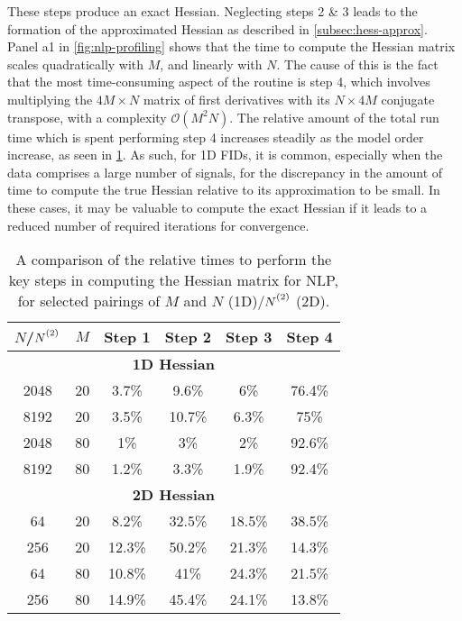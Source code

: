 These steps produce an exact Hessian. Neglecting steps 2 \& 3 leads to the
formation of the approximated Hessian as described in
\cref{subsec:hess-approx}. Panel a1 in \cref{fig:nlp-profiling} shows that the
time to compute the Hessian matrix scales quadratically with $M$, and
linearly with $N$. The cause of this is the fact that the most time-consuming
aspect of the routine is step 4, which involves multiplying the $4M \times N$
matrix of first derivatives with its  $N \times 4M$ conjugate transpose, with a
complexity $\mathcal{O}(M^2N)$. The relative amount of the total run time which
is spent performing step 4 increases steadily as the model order increase, as
seen in \cref{tab:hess-steps}.
As such, for \ac{1D} \acp{FID}, it is
common, especially when the data comprises a large number of
signals, for the discrepancy in the amount of time to compute the true
Hessian relative to its approximation to be small. In these cases, it may be
valuable to compute the exact Hessian if it leads to a reduced number of
required iterations for convergence.
\begin{table}
    \begin{center}
        \begin{tabular}{ c c c c c c }
            \toprule
            $N$/$\Ntwo$ &
            $M$ &
            Step 1 &
            Step 2 &
            Step 3 &
            Step 4 \\
            \midrule
            \multicolumn{6}{c}{\textbf{1D Hessian}}\\
            \midrule
            2048 & 20 & 3.7\% & 9.6\% & 6\% & 76.4\% \\
            8192 & 20 & 3.5\% & 10.7\% & 6.3\% & 75\% \\
            2048 & 80 & 1\% & 3\% & 2\% & 92.6\% \\
            8192 & 80 & 1.2\% & 3.3\% & 1.9\% & 92.4\% \\
            \midrule
            \multicolumn{6}{c}{\textbf{2D Hessian}}\\
            \midrule
            64 & 20 & 8.2\% & 32.5\% & 18.5\% & 38.5\% \\
            256 & 20 & 12.3\% & 50.2\% & 21.3\% & 14.3\% \\
            64 & 80 & 10.8\% & 41\% & 24.3\% & 21.5\% \\
            256 & 80 & 14.9\% & 45.4\% & 24.1\% & 13.8\% \\
            \bottomrule
        \end{tabular}
    \end{center}
    \caption[
        A comparison of the relative times to perform the key steps in
        computing the Hessian matrix for \acs{NLP}.
    ]{
        A comparison of the relative times to perform the key steps in
        computing the Hessian matrix for \acs{NLP}, for selected pairings of
        $M$ and $N$ (\ac{1D})/$\Ntwo$ (\ac{2D}).
    }
    \label{tab:hess-steps}
\end{table}

